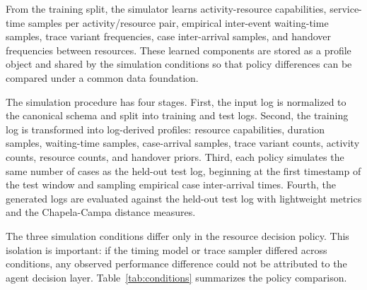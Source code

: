 From the training split, the simulator learns activity-resource
capabilities, service-time samples per activity/resource pair, empirical
inter-event waiting-time samples, trace variant frequencies, case
inter-arrival samples, and handover frequencies between resources. These
learned components are stored as a profile object and shared by the
simulation conditions so that policy differences can be compared under a
common data foundation.

The simulation procedure has four stages. First, the input log is
normalized to the canonical schema and split into training and test
logs. Second, the training log is transformed into log-derived profiles:
resource capabilities, duration samples, waiting-time samples,
case-arrival samples, trace variant counts, activity counts, resource
counts, and handover priors. Third, each policy simulates the same
number of cases as the held-out test log, beginning at the first
timestamp of the test window and sampling empirical case inter-arrival
times. Fourth, the generated logs are evaluated against the held-out
test log with lightweight metrics and the Chapela-Campa distance
measures.

The three simulation conditions differ only in the resource decision
policy. This isolation is important: if the timing model or trace
sampler differed across conditions, any observed performance difference
could not be attributed to the agent decision layer. Table~\ref{tab:conditions} summarizes
the policy comparison.

